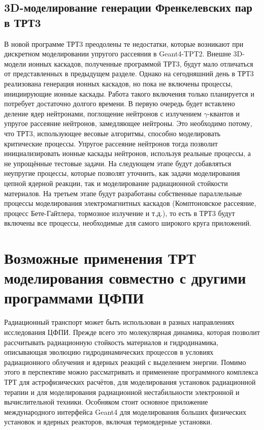 \documentclass[a4paper,12pt]{article}
\begin{document}
\begin{large}
\subsection{3D-моделирование генерации Френкелевских пар в ТРТ3}
\label{subMod2}

  В новой программе ТРТ3 преодолены те недостатки, которые возникают при дискретном моделировании упругого рассеяния в Geant4-TPT2.
  Внешне 3D-модели ионных каскадов, полученные программой ТРТ3, будут мало отличаться от представленных в предыдущем разделе.
  Однако на сегодняшний день в ТРТ3 реализована генерация ионных каскадов, но пока не включены процессы, инициирующие ионные каскады.
  Работа такого включения только планируется и потребует достаточно долгого времени.
  В первую очередь будет вставлено деление ядер нейтронами, поглощение нейтронов с излучением $\gamma$-квантов и упругое рассеяние нейтронов, замедляющее нейтроны.
  Это необходимо потому, что ТРТ3, использующее весовые алгоритмы, способно моделировать критические процессы.
  Упругое рассеяние нейтронов тогда позволит инициализировать ионные каскады нейтронов, используя реальные процессы, а не упрощённые тестовые задачи.
  На следующем этапе будут добавляться неупругие процессы, которые позволят уточнить, как задачи моделирования цепной ядерной реакции, так и моделирование радиационной стойкости материалов.
  На третьем этапе будут разработаны собственные параллельные процессы моделирования электромагнитных каскадов (Комптоновское рассеяние, процесс Бете-Гайтлера, тормозное излучение и т.д.), то есть в ТРТ3 будут включены все процессы, необходимые для самого широкого круга приложений.

\clearpage
\section{Возможные применения ТРТ моделирования совместно с другими программами ЦФПИ}
\label{Pract}

  Радиационный транспорт может быть использован в разных направлениях исследования ЦФПИ.
  Прежде всего это молекулярная динамика, которая позволит рассчитывать радиационную стойкость материалов и гидродинамика, описывающая эволюцию гидродинамических процессов в условиях радиационного облучения и ядерных реакций с выделением энергии.
  Помимо этого в перспективе можно рассматривать и применение программного комплекса ТРТ для астрофизических расчётов, для моделирования установок радиационной терапии и для моделирования радиационной нестабильности электронной и вычислительной техники.
  Особняком стоит основное приложение международного интерфейса Geant4 для моделирования больших физических установок и ядерных реакторов, включая термоядерные установки.


\end{large}
\end{document}
